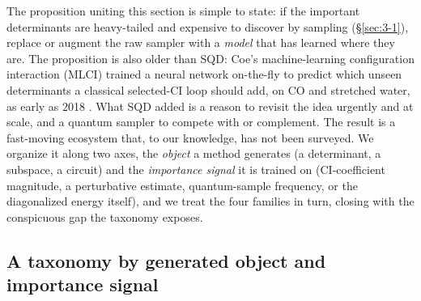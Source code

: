 \documentclass[11pt]{article}
\begin{document}
The proposition uniting this section is simple to state: if the important determinants are heavy-tailed and expensive to discover by sampling (\S\ref{sec:3-1}), replace or augment the raw sampler with a \emph{model} that has learned where they are. The proposition is also older than SQD: Coe's machine-learning configuration interaction (MLCI) trained a neural network on-the-fly to predict which unseen determinants a classical selected-CI loop should add, on CO and stretched water, as early as 2018 \cite{coe2018,coe2019}. What SQD added is a reason to revisit the idea urgently and at scale, and a quantum sampler to compete with or complement. The result is a fast-moving ecosystem that, to our knowledge, has not been surveyed. We organize it along two axes, the \emph{object} a method generates (a determinant, a subspace, a circuit) and the \emph{importance signal} it is trained on (CI-coefficient magnitude, a perturbative estimate, quantum-sample frequency, or the diagonalized energy itself), and we treat the four families in turn, closing with the conspicuous gap the taxonomy exposes.


\subsection{A taxonomy by generated object and importance signal}\label{sec:4-1}
\end{document}

